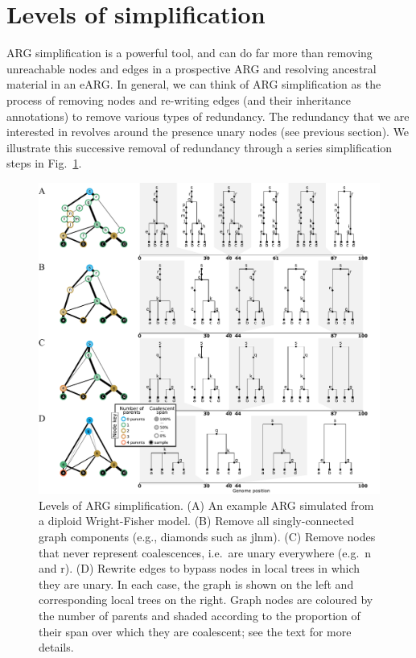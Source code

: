 \documentclass{article}
\newcommand{\noderef}[1]{\textsf{#1}}
\begin{document}
\section*{Levels of simplification}\label{ARG_simplification}
ARG simplification is a powerful tool, and can do far more
than removing unreachable nodes and edges in a prospective ARG
and resolving ancestral material in an eARG.
In general, we can think of
ARG simplification as the process
of removing nodes and re-writing edges (and their inheritance annotations)
to remove various types of redundancy.
The redundancy that we are interested in
revolves around the presence unary nodes (see previous section).
We illustrate this successive removal of redundancy
through a series simplification steps
in Fig.~\ref{fig-simplification}.

\begin{figure}
\centering
\includegraphics[width=\textwidth]{illustrations/simplification}
\caption{\label{fig-simplification}
Levels of ARG simplification.
(A) An example ARG simulated from a diploid Wright-Fisher model.
(B) Remove all
singly-connected graph components (e.g., diamonds such as \noderef{jlnm}).
(C) Remove nodes that never represent coalescences,
i.e.\ are unary everywhere (e.g.\ \noderef{n} and \noderef{r}).
(D) Rewrite edges to bypass nodes in local trees in which they are unary.
In each case, the graph is shown on the left
and corresponding local trees on the right.
Graph nodes are coloured by the number of parents and shaded
according to the proportion of their span over which they are coalescent;
see the text for more details.
}
\end{figure}
\end{document}

